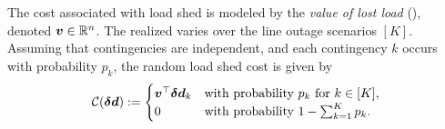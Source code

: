 The cost associated with load shed is modeled by the \emph{value of lost load} (\VoLL{}), denoted ${{\bm{v}}}\in\mathbb{R}^n$. The realized \VoLL{} varies over the line outage scenarios $[K]$. Assuming that contingencies are independent,  and each contingency $k$ occurs with probability $p_k$, the random load shed cost is given by
\begin{equation}
    \mathcal{C}({\bm{\delta d}}) := \begin{cases}
      {{\bm{v}}}^\top {\bm{\delta d}}_k & \text{with probability $p_k$ for $k\in[K]$}, \\
      0 & \text{with probability } 1 - \sum_{k = 1}^K p_k.
    \end{cases}
    \label{eq:voll}
\end{equation}




